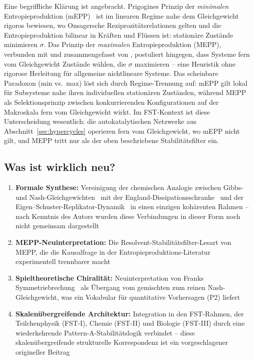\documentclass[12pt,a4paper]{article}
\theoremstyle{remark}
\begin{document}
\noindent
Eine begriffliche Klärung ist angebracht. Prigogines Prinzip der \emph{minimalen} Entropieproduktion (mEPP)~\citep{Prigogine1947} ist im linearen Regime nahe dem Gleichgewicht rigoros bewiesen, wo Onsagersche Reziprozitätsrelationen gelten und die Entropieproduktion bilinear in Kräften und Flüssen ist: stationäre Zustände minimieren $\sigma$. Das Prinzip der \emph{maximalen} Entropieproduktion (MEPP), verbunden mit \citet{Ziegler1963} und zusammengefasst von \citet{MEPP2006}, postuliert hingegen, dass Systeme fern vom Gleichgewicht Zustände wählen, die $\sigma$ maximieren -- eine Heuristik ohne rigorose Herleitung für allgemeine nichtlineare Systeme. Das scheinbare Paradoxon (min vs.\ max) löst sich durch Regime-Trennung auf: mEPP gilt lokal für Subsysteme nahe ihren individuellen stationären Zuständen, während MEPP als Selektionsprinzip zwischen konkurrierenden Konfigurationen auf der Makroskala fern vom Gleichgewicht wirkt. Im FST-Kontext ist diese Unterscheidung wesentlich: die autokatalytischen Netzwerke aus Abschnitt~\ref{sec:hypercycles} operieren fern vom Gleichgewicht, wo mEPP nicht gilt, und MEPP tritt nur als der oben beschriebene Stabilitätsfilter ein.

\subsection{Was ist wirklich neu?}

\begin{enumerate}
    \item \textbf{Formale Synthese:} Vereinigung der chemischen Analogie zwischen Gibbs- und Nash-Gleichgewichten~\citep{MetabolicNash} mit der England-Dissipationsschranke~\citep{England2013} und der Eigen--Schuster-Replikator-Dynamik~\citep{Eigen1979} in einen einzigen kohärenten Rahmen -- nach Kenntnis des Autors wurden diese Verbindungen in dieser Form noch nicht gemeinsam dargestellt
    \item \textbf{MEPP-Neuinterpretation:} Die Resolvent-Stabilitätsfilter-Lesart von MEPP, die die Kausalfrage in der Entropieproduktions-Literatur experimentell trennbarer macht
    \item \textbf{Spieltheoretische Chiralität:} Neuinterpretation von Franks Symmetriebrechung~\citep{Frank1953} als Übergang vom gemischten zum reinen Nash-Gleichgewicht, was ein Vokabular für quantitative Vorhersagen (P2) liefert
    \item \textbf{Skalenübergreifende Architektur:} Integration in den FST-Rahmen, der Teilchenphysik (FST-I), Chemie (FST-II) und Biologie (FST-III) durch eine wiederkehrende Pattern-A-Stabilitätslogik verbindet -- diese skalenübergreifende strukturelle Korrespondenz ist ein vorgeschlagener origineller Beitrag
\end{enumerate}
\end{document}
